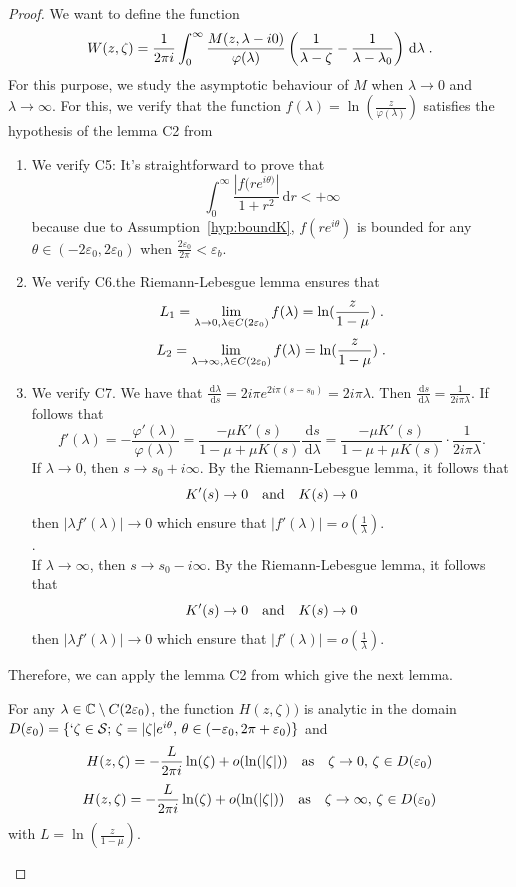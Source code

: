 \documentclass[11pt]{amsart}
\newcommand{\diff}{\,\mathrm{d}}
\begin{document}
\begin{proof}
We want to define the function
\begin{align*}
    W(z, \zeta) = \frac{1}{2\pi i}\int_0^\infty  \frac{M(z,\lambda-i0)}{\varphi(\lambda)}\left( \frac{1}{\lambda-\zeta} - \frac{1}{\lambda-\lambda_0}\right) \diff \lambda 
    \eqfinp
\end{align*}
For this purpose, we study the asymptotic behaviour of $M$ when $\lambda \to 0$ and $\lambda \to \infty$. For this, we verify that the function $f(\lambda) = \ln(\frac{z}{\varphi(\lambda)})$ satisfies the hypothesis of the lemma C2 from \cite{escobedo2007fundamental}
\begin{enumerate}
    \item We verify C5: It's straightforward to prove that 
    $$\int_0^\infty \frac{|f(r e^{i\theta)}|}{1+r^2}\diff r < +\infty$$ because due to Assumption~\ref{hyp:boundK}, $f(re^{i\theta})$ is bounded for any $\theta \in (-2\varepsilon_0, 2\varepsilon_0)$ when $\frac{2\varepsilon_0}{2\pi} < \varepsilon_b$. 
    \item We verify C6.the Riemann-Lebesgue lemma ensures that 
    $$ L_1 = \lim_{\lambda \to 0, \lambda \in C(2\varepsilon_0)} f(\lambda) = \ln(\frac{z}{1-\mu}) \; .$$
    $$ L_2 = \lim_{\lambda \to \infty, \lambda \in C(2\varepsilon_0)} f(\lambda) = \ln(\frac{z}{1-\mu}) \; .$$
    \item We verify C7. We have that $\frac{\diff \lambda}{\diff s} = 2i\pi e^{2i\pi(s-s_0)} = 2i\pi \lambda$. Then 
    $\frac{\diff s}{\diff \lambda} = \frac{1}{2i\pi\lambda}$. 
    If follows that 
    $$f'(\lambda) =- \frac{\varphi'(\lambda)}{\varphi(\lambda)} = \frac{-\mu K'(s)}{1 - \mu + \mu K(s)}\frac{\diff s}{\diff \lambda} = \frac{-\mu K'(s)}{1 - \mu + \mu K(s)} \cdot \frac{1}{2i\pi\lambda}. $$
    If $\lambda \to 0$, then $s \to s_0+i\infty$. By the Riemann-Lebesgue lemma, it follows that $$K'(s) \to 0 \quad \text{and} \quad K(s) \to 0$$ then  $|\lambda f'(\lambda)| \to 0$ which ensure that $|f'(\lambda)| = o(\frac{1}{\lambda})$. \\. \\
    If $\lambda \to \infty$, then $s \to s_0-i\infty$. By the Riemann-Lebesgue lemma, it follows that $$K'(s) \to 0 \quad \text{and} \quad K(s) \to 0$$ then  $|\lambda f'(\lambda)| \to 0$ which ensure that $|f'(\lambda)| = o(\frac{1}{\lambda})$. \\
\end{enumerate}
Therefore, we can apply the lemma C2 from \cite{escobedo2007fundamental} which give the next lemma. 

\begin{lemma}\label{EscARMA:C2}For any $\lambda \in \mathbb{C} \setminus C(2\varepsilon_0)$, the function $H(z,\zeta))$ is analytic in the domain $D(\varepsilon_0) = \{ `\zeta \in \mathcal{S}; \, \zeta = |\zeta|e^{i\theta}, \, \theta \in (-\varepsilon_0, 2\pi+\varepsilon_0)\}$ and 
$$ H(z, \zeta) = -\frac{L}{2\pi i} \ln(\zeta) + o(\ln(|\zeta|)) \quad \text{as} \quad \zeta\to 0,\, \zeta \in D(\varepsilon_0)$$ 
$$ H(z, \zeta) = -\frac{L}{2\pi i} \ln(\zeta) + o(\ln(|\zeta|)) \quad \text{as} \quad \zeta\to \infty,\, \zeta \in D(\varepsilon_0)$$ 
with $L = \ln(\frac{z}{1-\mu})$. 
\end{lemma}


\end{proof}
\end{document}
